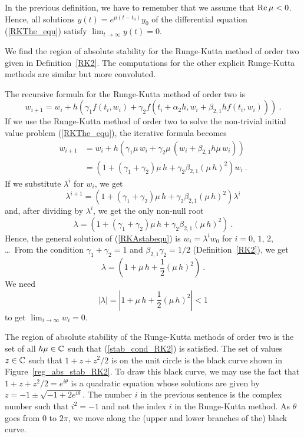 \begin{rmk}
In the previous definition, we have to remember that we assume that
$\operatorname{Re} \mu <0$.  Hence, all solutions $y(t) = e^{\mu (t-t_0)}y_0$ of the
differential equation (\ref{RKThe_equ}) satisfy
$\displaystyle \lim_{t\to \infty} y(t) = 0$.
\end{rmk}

\begin{egg}
We find the region of absolute stability for the Runge-Kutta
method of order two given in Definition~\ref{RK2}.  The computations
for the other explicit Runge-Kutta methods are similar but more convoluted.

The recursive formula for the Runge-Kutta method of order two is
\[
w_{i+1} = w_i + h \left( \gamma_1 f(t_i,w_i) + \gamma_2 f(t_i +
\alpha_2 h,w_i + \beta_{2,1} h f(t_i,w_i)) \right) \  .
\]
If we use the Runge-Kutta method of order two to solve the
non-trivial initial value problem (\ref{RKThe_equ}), the iterative
formula becomes
\begin{equation}\label{RKAstabequ}
\begin{split}
w_{i+1} &= w_i + h\left( \gamma_1 \mu\, w_i
+ \gamma_2 \mu\, (w_i + \beta_{2,1} h \mu\, w_i) \right) \\
 &= \left( 1 + (\gamma_1 + \gamma_2)\mu\, h + \gamma_2 \beta_{2,1}
(\mu\,h)^2 \right) w_i \ .
\end{split}
\end{equation}
If we substitute $\lambda^i$ for $w_i$, we get
\[
\lambda^{i+1} = \left( 1 + (\gamma_1 + \gamma_2)\mu\, h + \gamma_2
\beta_{2,1} (\mu\, h)^2 \right) \lambda^i
\]
and, after dividing by $\lambda^i$, we get the only non-null root
\[
\lambda = \left( 1 + (\gamma_1 + \gamma_2)\mu\, h + \gamma_2
\beta_{2,1} (\mu\, h)^2 \right) \ .
\]
Hence, the general solution of (\ref{RKAstabequ}) is
$w_i = \lambda^i w_0$ for $i=0$, $1$, $2$, \ldots\ From the condition
$\gamma_1 + \gamma_2 = 1$ and $\beta_{2,1} \gamma_2 = 1/2$
(Definition~\ref{RK2}), we get
\begin{equation} \label{abs_stab_cond_RK2}
\lambda = \left( 1 + \mu\, h + \frac{1}{2} (\mu\, h)^2 \right) \ .
\end{equation}
We need
\begin{equation} \label{stab_cond_RK2}
\left| \lambda \right| =
\left| 1 + \mu\, h + \frac{1}{2} (\mu\, h)^2 \right| < 1
\end{equation}
to get $\displaystyle \lim_{i\to \infty} w_i = 0$.

The region of absolute stability of the Runge-Kutta methods of order
two is the set of all $h\mu \in \mathbb{C}$ such that
(\ref{stab_cond_RK2}) is satisfied.  The set of values
$z \in \mathbb{C}$ such that $1 + z + z^2/2$ is on the unit circle
is the black curve shown in Figure~\ref{reg_abs_stab_RK2}.
To draw this black curve, we may use the fact that
$1 + z + z^2/2 = e^{i\theta}$ is a quadratic equation whose
solutions are given by $z = -1 \pm \sqrt{-1+2 e^{i \theta}}$.
The number $i$ in the previous sentence is the complex number such
that $i^2 = -1$ and not the index $i$ in the Runge-Kutta method.
As $\theta$ goes from $0$ to $2\pi$, we move along the (upper and
lower branches of the) black curve.


\end{egg}
